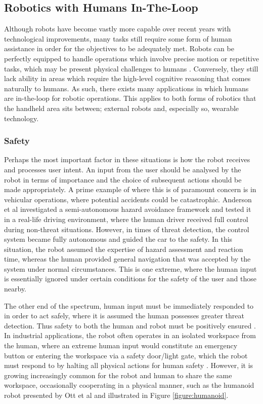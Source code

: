 \documentclass[11pt]{article}
\begin{document}
\subsection{Robotics with Humans In-The-Loop} \label{intheloop}

Although robots have become vastly more capable over recent years with technological improvements, many tasks still require some form of human assistance in order for the objectives to be adequately met. Robots can be perfectly equipped to handle operations which involve precise motion or repetitive tasks, which may be present physical challenges to humans \cite{Chipalkatty2012}. Conversely, they still lack ability in areas which require the high-level cognitive reasoning that comes naturally to humans. As such, there exists many applications in which humans are in-the-loop for robotic operations. This applies to both forms of robotics that the handheld area sits between; external robots and, especially so, wearable technology.  

\subsubsection{Safety}

Perhaps the most important factor in these situations is how the robot receives and processes user intent. An input from the user should be analysed by the robot in terms of importance and the choice of subsequent actions should be made appropriately. A prime example of where this is of paramount concern is in vehicular operations, where potential accidents could be catastrophic. Anderson et al \cite{Anderson2010} investigated a semi-autonomous hazard avoidance framework and tested it in a real-life driving environment, where the human driver received full control during non-threat situations. However, in times of threat detection, the control system became fully autonomous and guided the car to the safety. In this situation, the robot assumed the expertise of hazard assessment and reaction time, whereas the human provided general navigation that was accepted by the system under normal circumstances. This is one extreme, where the human input is essentially ignored under certain conditions for the safety of the user and those nearby. 

The other end of the spectrum, human input must be immediately responded to in order to act safely, where it is assumed the human possesses greater threat detection. Thus safety to both the human and robot must be positively ensured \cite{Haddadin2007}. In industrial applications, the robot often operates in an isolated workspace from the human, where an extreme human input would constitute an emergency button or entering the workspace via a safety door/light gate, which the robot must respond to by halting all physical actions for human safety \cite{ISOGuards}. However, it is growing increasingly common for the robot and human to share the same workspace, occasionally cooperating in a physical manner, such as the humanoid robot presented by Ott et al \cite{Ott2006} and illustrated in Figure \ref{figure:humanoid}.
\end{document}

